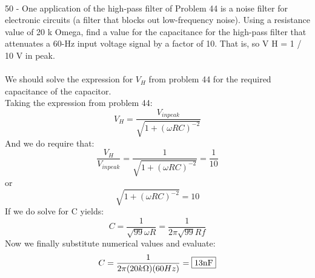 \documentclass{report}
\begin{document}
\paragraph{}
50 - One application of the high-pass filter of Problem 44 is a noise filter
for electronic circuits (a filter that blocks out low-frequency noise). Using a resistance value of 20 k Omega, find a value for the capacitance for the high-pass filter that attenuates a 60-Hz input voltage signal by a factor of 10. That is, so V H = 1 / 10 V in peak.\\
\\
We should solve the expression for $V_H$ from problem 44 for the required capacitance of the capacitor.\\
Taking the expression from problem 44:
$$V_H = \frac{V_{in peak}}{\sqrt{1 + (\omega RC)^{-2}}}$$
And we do require that:
$$\frac{V_H}{V_{in peak}} = \frac{1}{\sqrt{1 + (\omega RC)^{-2}}} = \frac{1}{10}$$
or
$$\sqrt{1 + (\omega RC)^{-2}} = 10$$
If we do solve for C yields:
$$C = \frac{1}{\sqrt{99}\omega R} = \frac{1}{2\pi \sqrt{99}Rf}$$
Now we finally substitute numerical values and evaluate:
$$C = \frac{1}{2\pi(20k\Omega)(60Hz)} = \fbox{13nF}$$
\end{document}
